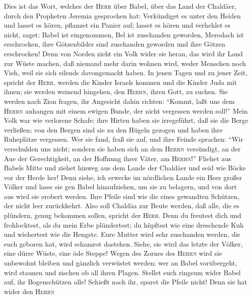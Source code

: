  Dies ist das Wort, welches der \textsc{Herr} über Babel,
über das Land der Chaldäer, durch den Propheten Jeremia gesprochen hat:
 Verkündiget es unter den Heiden und lasset es hören,
pflanzet ein Panier auf; lasset es hören und verhehlet es nicht, saget:
Babel ist eingenommen, Bel ist zuschanden geworden, Merodach ist
erschrocken, ihre Götzenbilder sind zuschanden geworden und ihre Götzen
erschrocken!  Denn von Norden zieht ein Volk wider sie
heran, das wird ihr Land zur Wüste machen, daß niemand mehr darin wohnen
wird, weder Menschen noch Vieh, weil sie sich eilends davongemacht
haben.  In jenen Tagen und zu jener Zeit, spricht der
\textsc{Herr}, werden die Kinder Israels kommen und die Kinder Juda mit
ihnen; sie werden weinend hingehen, den \textsc{Herrn}, ihren Gott, zu
suchen.  Sie werden nach Zion fragen, ihr Angesicht dahin
richten: ``Kommt, laßt uns dem \textsc{Herrn} anhangen mit einem ewigen
Bunde, der nicht vergessen werden soll!''  Mein Volk war
wie verlorene Schafe; ihre Hirten haben sie irregeführt, daß sie die
Berge verließen; von den Bergen sind sie zu den Hügeln gezogen und haben
ihre Ruheplätze vergessen.  Wer sie fand, fraß sie auf,
und ihre Feinde sprachen: ``Wir verschulden uns nicht; sondern sie haben
sich an dem \textsc{Herrn} versündigt, an der Aue der Gerechtigkeit, an
der Hoffnung ihrer Väter, am \textsc{Herrn}!''  Fliehet
aus Babels Mitte und ziehet hinweg aus dem Lande der Chaldäer und seid
wie Böcke vor der Herde her!  Denn siehe, ich erwecke im
nördlichen Lande ein Heer großer Völker und lasse sie gen Babel
hinaufziehen, um sie zu belagern, und von dort aus wird sie erobert
werden. Ihre Pfeile sind wie die eines gewandten Schützen, der nicht
leer zurückkehrt.  Also soll Chaldäa zur Beute werden,
daß alle, die es plündern, genug bekommen sollen, spricht der
\textsc{Herr}.  Denn du freutest dich und frohlocktest,
als du mein Erbe plündertest; du hüpftest wie eine dreschende Kuh und
wiehertest wie die Hengste.  Eure Mutter wird sehr
zuschanden werden, die euch geboren hat, wird schamrot dastehen. Siehe,
sie wird das letzte der Völker, eine dürre Wüste, eine öde Steppe!
 Wegen des Zornes des \textsc{Herrn} wird sie unbewohnt
bleiben und gänzlich verwüstet werden; wer an Babel vorübergeht, wird
staunen und zischen ob all ihren Plagen.  Stellet euch
ringsum wider Babel auf, ihr Bogenschützen alle! Schießt nach ihr,
sparet die Pfeile nicht! Denn sie hat wider den \textsc{Herrn}
